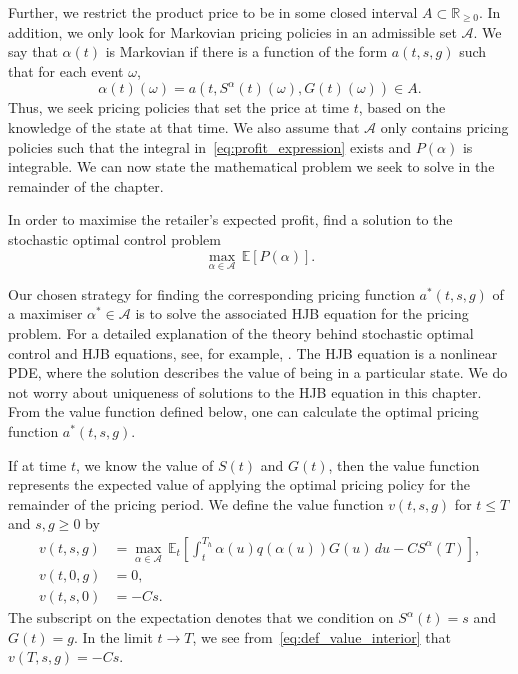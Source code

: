 \documentclass[main.tex]{subfiles}
\begin{document}
Further, we restrict the product price to be in some closed  interval
$A\subset\mathbb{R}_{\geq 0}$.
In addition, we only look for Markovian pricing policies in an
admissible set $\mathcal{A}$. We say that $\alpha(t)$ is Markovian if
there is a function of the form $a(t,s,g)$ such that for each event $\omega$,
\begin{equation}
  \alpha(t)(\omega) = a(t,S^\alpha(t)(\omega), G(t)(\omega)) \in A.
\end{equation}
Thus, we seek pricing policies that set the price at time $t$, based
on the knowledge of the state at that time. We also assume that
$\mathcal{A}$ only contains pricing policies such that the integral
in~\eqref{eq:profit_expression} exists and
$P(\alpha)$ is integrable. We can now state the mathematical problem we
seek to solve in the remainder of the chapter.
\begin{mydef}
  In order to maximise the retailer's expected profit, find a solution to
  the stochastic optimal control problem
  \begin{equation}\label{eq:pricing_problem}
    \max_{\alpha\in \mathcal{A}}\,\mathbb{E}[P(\alpha)].
  \end{equation}
\end{mydef}
Our chosen strategy for finding the corresponding pricing function $a^*(t,s,g)$
of a maximiser $\alpha^*\in\mathcal{A}$ is to solve the associated HJB
equation for the pricing problem.
For a detailed explanation of the theory behind stochastic optimal control and
HJB equations, see, for example, \citet{pham2009continuous}.
The HJB equation is a nonlinear PDE, where the solution describes the
value of being in a particular state. We do not worry about
uniqueness of solutions to the HJB equation in this chapter. From the
value function defined below, one can
calculate the optimal pricing function $a^*(t,s,g)$.

If at time $t$, we know the value of $S(t)$ and $G(t)$, then the value
function represents the expected value of applying the optimal pricing
policy for the remainder of the pricing period.
We define the value function $v(t,s,g)$ for $t \leq T$ and $s,g\geq
0$ by
\begin{align}
  v(t,s,g) &=
             \max_{\alpha \in \mathcal{A}}\,
             \mathbb{E}_{t}\left[
             \int_t^{T_h}\alpha(u)q(\alpha(u))G(u)\,du-CS^\alpha(T)
             \right],\label{eq:def_value_interior}\\
  v(t,0,g)&= 0,\\
  v(t,s,0)&=-Cs.
\end{align}
The subscript on the expectation denotes that we condition on
$S^\alpha(t)=s$ and $G(t)=g$.
In the limit $t\to T$, we see from~\eqref{eq:def_value_interior} that
$v(T,s,g)=-Cs$.
\end{document}
